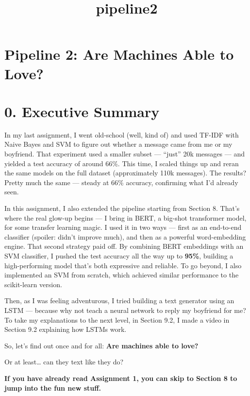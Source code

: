 \documentclass[11pt]{article}
\title{pipeline2}
\begin{document}
    
    \maketitle
    
    

    
    \section{Pipeline 2: Are Machines Able to
Love?}\label{pipeline-2-are-machines-able-to-love}

\section{0. Executive Summary}\label{executive-summary}

In my last assignment, I went old-school (well, kind of) and used TF-IDF
with Naive Bayes and SVM to figure out whether a message came from me or
my boyfriend. That experiment used a smaller subset --- ``just'' 20k
messages --- and yielded a test accuracy of around 66\%. This time, I
scaled things up and reran the same models on the full dataset
(approximately 110k messages). The results? Pretty much the same ---
steady at 66\% accuracy, confirming what I'd already seen.

In this assignment, I also extended the pipeline starting from Section
8. That's where the real glow-up begins --- I bring in BERT, a big-shot
transformer model, for some transfer learning magic. I used it in two
ways --- first as an end-to-end classifier (spoiler: didn't improve
much), and then as a powerful word-embedding engine. That second
strategy paid off. By combining BERT embeddings with an SVM classifier,
I pushed the test accuracy all the way up to \textbf{95\%}, building a
high-performing model that's both expressive and reliable. To go beyond,
I also implemented an SVM from scratch, which achieved similar
performance to the scikit-learn version.

Then, as I was feeling adventurous, I tried building a text generator
using an LSTM --- because why not teach a neural network to reply my
boyfriend for me? To take my explanations to the next level, in Section
9.2, I made a video in Section 9.2 explaining how LSTMs work.

So, let's find out once and for all: \textbf{Are machines able to love?}

Or at least\ldots{} can they text like they do?

\textbf{If you have already read Assignment 1, you can skip to Section 8
to jump into the fun new stuff.}
\end{document}
